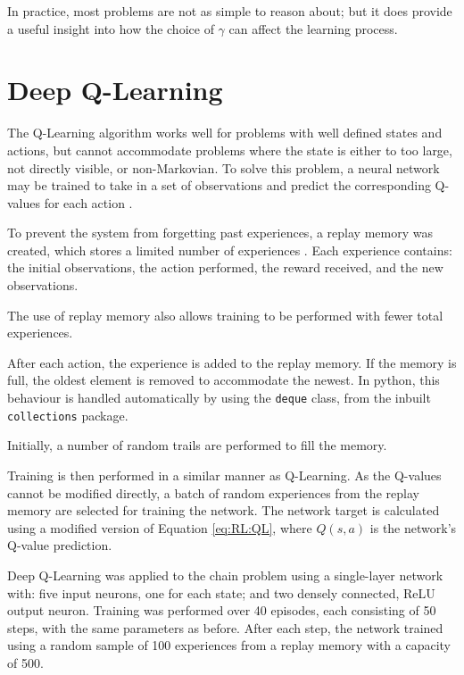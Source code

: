 In practice, most problems are not as simple to reason about; but it does
provide a useful insight into how the choice of $\gamma$ can affect the learning
process.



\section{Deep Q-Learning}

The Q-Learning algorithm works well for problems with well defined states and
actions, but cannot accommodate problems where the state is either to too large,
not directly visible, or non-Markovian.
To solve this problem, a neural network may be trained to take in a set of
observations and predict the corresponding Q-values for each action
\citep{Lin:1990:Self}.

To prevent the system from forgetting past experiences, a replay memory was
created, which stores a limited number of experiences \citep{Lin:1992:Self}.
Each experience contains: the initial observations, the action performed,
the reward received, and the new observations.

The use of replay memory also allows training to be performed with fewer
total experiences.

After each action, the experience is added to the replay memory.
If the memory is full, the oldest element is removed to accommodate the newest.
In python, this behaviour is handled automatically by using the \texttt{deque}
class, from the inbuilt \texttt{collections} package.

Initially, a number of random trails are performed to fill the memory.

Training is then performed in a similar manner as Q-Learning.
As the Q-values cannot be modified directly, a batch of random experiences from
the replay memory are selected for training the network.
The network target is calculated using a modified version of Equation
\ref{eq:RL:QL}, where $Q(s,a)$ is the network's Q-value prediction.

Deep Q-Learning was applied to the chain problem using a single-layer network
with: five input neurons, one for each state; and two densely connected, ReLU
output neuron.
Training was performed over 40 episodes, each consisting of 50 steps, with the
same parameters as before.
After each step, the network trained using a random sample of 100 experiences
from a replay memory with a capacity of 500.



